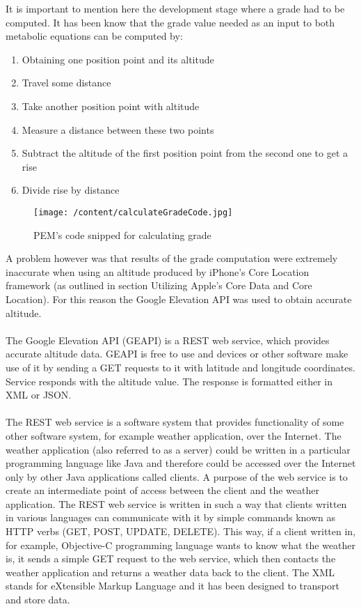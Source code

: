 \documentclass[12pt, a4paper]{report}   %
\begin{document}
\begin{enumerate}
\clearpage
It is important to mention here the development stage where a grade had to be computed. 
It has been know that the grade value needed as an input to both metabolic equations can be computed by:\\
\begin{enumerate}
	\item Obtaining one position point and its altitude
	\item Travel some distance
	\item Take another position point with altitude
	\item Measure a distance between these two points
	\item Subtract the altitude of the first position point from the second one to get a rise
	\item Divide rise by distance\\
\end{enumerate}


\begin{figure}[H]
  \centering
	\texttt{[image: /content/calculateGradeCode.jpg]}
	  \caption{PEM's code snipped for calculating grade}
\end{figure}


A problem however was that results of the grade computation were extremely inaccurate when using an altitude produced by iPhone's Core Location framework (as outlined in section Utilizing Apple's Core Data and Core Location). For this reason the Google Elevation API was used to obtain accurate altitude.
\\ \\
The Google Elevation API (GEAPI) is a REST web service, which provides accurate altitude data. GEAPI is free to use and devices or other software make use of it by sending a GET requests to it with latitude and longitude coordinates. Service responds with the altitude value. The response is formatted either in XML or JSON.\\ \\
The REST web service is a software system that provides functionality of some other software system, for example weather application, over the Internet. The weather application (also referred to as a server) could be written in a particular programming language like Java and therefore could be accessed over the Internet only by other Java applications called clients. A purpose of the web service is to create an intermediate point of access between the client and the weather application. The REST web service is written in such a way that clients written in various languages can communicate with it by simple commands known as HTTP verbs (GET, POST, UPDATE, DELETE). This way, if a client written in, for example, Objective-C programming language wants to know what the weather is, it sends a simple GET request to the web service, which then contacts the weather application and returns a weather data back to the client.
The XML stands for eXtensible Markup Language and it has been designed to transport and store data.



\end{enumerate}
\end{document}
